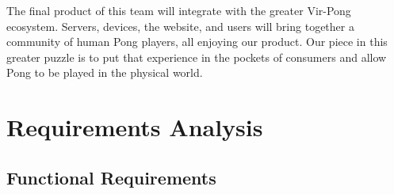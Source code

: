 \documentclass[12pt]{article}
\begin{document}
The final product of this team will integrate with the greater Vir-Pong ecosystem.  Servers, devices, the website, and users will bring together a community of human Pong players, all enjoying our product.  Our piece in this greater puzzle is to put that experience in the pockets of consumers and allow Pong to be played in the physical world.


\section{Requirements Analysis}
\subsection{Functional Requirements}

\singlespacing
\end{document}
